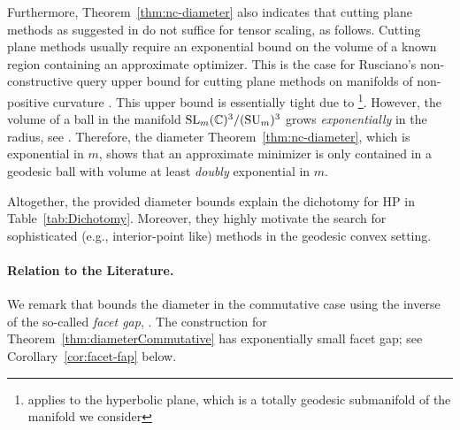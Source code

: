 Furthermore, Theorem~\ref{thm:nc-diameter} also indicates that cutting plane methods as suggested in \cite{rusciano2020riemannian} do not suffice for tensor scaling, as follows.
Cutting plane methods usually require an exponential bound on the volume of a known region containing an approximate optimizer. This is the case for Rusciano's non-constructive query upper bound for cutting plane methods on manifolds of non-positive curvature \cite{rusciano2020riemannian}. This upper bound is essentially tight due to \cite{hamilton2021no}\footnote{\cite{hamilton2021no} applies to the hyperbolic plane, which is a totally geodesic submanifold of the manifold we consider}.
However, the volume of a ball in the manifold $\operatorname{SL}_m(\mathbb C)^3/(\operatorname{SU}_m)^3$ grows \emph{exponentially} in the radius, see \cite{gualarnau1999volume}. Therefore, the diameter Theorem~\ref{thm:nc-diameter}, which is exponential in $m$,  shows that an approximate minimizer is only contained in a geodesic ball with volume at least \emph{doubly} exponential in $m$.

Altogether, the provided diameter bounds explain the dichotomy for HP in Table~\ref{tab:Dichotomy}. Moreover, they highly motivate the search for sophisticated (e.g., interior-point like) methods in the geodesic convex setting.




\paragraph{Relation to the Literature.}

We remark that \cite{burgisser2020interior} bounds the diameter in the commutative case using the inverse of the so-called \emph{facet gap}, \cite[Definition~1.8]{GradflowArXiv}. The construction for Theorem~\ref{thm:diameterCommutative} has exponentially small facet gap; see Corollary~\ref{cor:facet-fap} below.

